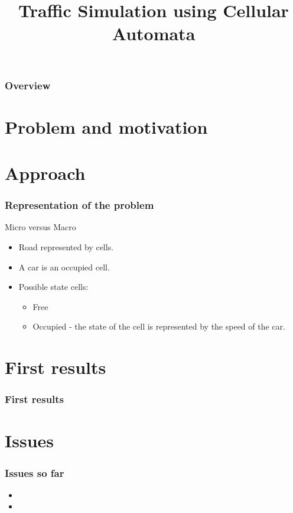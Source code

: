 \documentclass{beamer}
\title{Traffic Simulation using Cellular Automata}
\institute[Radboud University Nijmegen]{
  Radboud University Nijmegen}
\begin{document}
\begin{frame}
	\titlepage
\end{frame}

\begin{frame}
	\frametitle{Overview}
	\tableofcontents
\end{frame}

\section{Problem and motivation}
\begin{frame}
\end{frame}


\section{Approach}
\begin{frame}
\frametitle{Representation of the problem}
\large{Micro versus Macro}
\begin{itemize}
\item Road represented by cells.
\item A car is an occupied cell. 
\item Possible state cells:
\begin{itemize}
	\item Free
	\item Occupied - the state of the cell is represented by the speed of the car. 
\end{itemize}
\end{itemize}
\end{frame}


\section{First results}
\begin{frame}
\frametitle{First results}
\end{frame}



\section{Issues}
\begin{frame}
\frametitle{Issues so far}
\begin{itemize}
\item 
\item
\end{itemize}
\end{frame}
\end{document}
